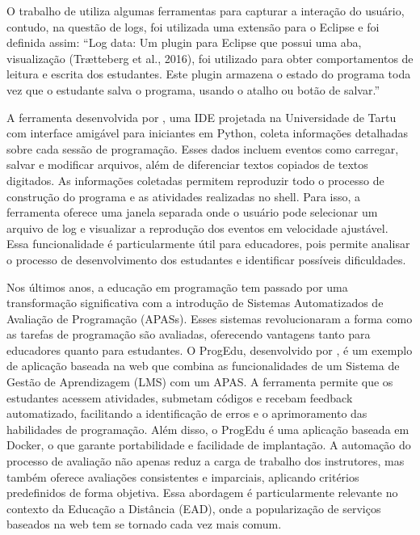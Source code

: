 O trabalho de \cite{mangaroska_exploring_2022} utiliza algumas ferramentas para capturar a interação do usuário, contudo, na questão de logs, foi utilizada uma extensão para o Eclipse e foi definida assim: ``Log data: Um plugin para Eclipse que possui uma aba, visualização (Trætteberg et al., 2016), foi utilizado para obter comportamentos de leitura e escrita dos estudantes. Este plugin armazena o estado do programa toda vez que o estudante salva o programa, usando o atalho ou botão de salvar.''

A ferramenta desenvolvida por \cite{annamaa2015thonny}, uma IDE projetada na Universidade de Tartu com interface amigável para iniciantes em Python, coleta informações detalhadas sobre cada sessão de programação. Esses dados incluem eventos como carregar, salvar e modificar arquivos, além de diferenciar textos copiados de textos digitados. As informações coletadas permitem reproduzir todo o processo de construção do programa e as atividades realizadas no shell. Para isso, a ferramenta oferece uma janela separada onde o usuário pode selecionar um arquivo de log e visualizar a reprodução dos eventos em velocidade ajustável. Essa funcionalidade é particularmente útil para educadores, pois permite analisar o processo de desenvolvimento dos estudantes e identificar possíveis dificuldades.

Nos últimos anos, a educação em programação tem passado por uma transformação significativa com a introdução de Sistemas Automatizados de Avaliação de Programação (APASs). Esses sistemas revolucionaram a forma como as tarefas de programação são avaliadas, oferecendo vantagens tanto para educadores quanto para estudantes. O ProgEdu, desenvolvido por \cite{nguyen_analyzing_2023}, é um exemplo de aplicação baseada na web que combina as funcionalidades de um Sistema de Gestão de Aprendizagem (LMS) com um APAS. A ferramenta permite que os estudantes acessem atividades, submetam códigos e recebam feedback automatizado, facilitando a identificação de erros e o aprimoramento das habilidades de programação. Além disso, o ProgEdu é uma aplicação baseada em Docker, o que garante portabilidade e facilidade de implantação. A automação do processo de avaliação não apenas reduz a carga de trabalho dos instrutores, mas também oferece avaliações consistentes e imparciais, aplicando critérios predefinidos de forma objetiva. Essa abordagem é particularmente relevante no contexto da Educação a Distância (EAD), onde a popularização de serviços baseados na web tem se tornado cada vez mais comum.

